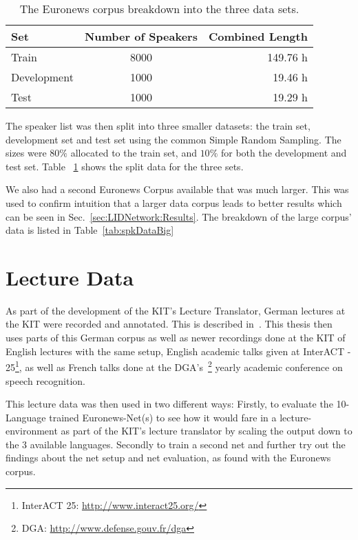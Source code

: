 \begin{table}[h!]
\label{tab:spkSplit}
\centering
\begin{tabular}{| l | c | r | }
	\hline
	\textbf{Set} & \textbf{Number of Speakers} & \textbf{Combined Length} \\
	\hline
	Train &  8000 & 149.76 h \\
	Development & 1000 & 19.46 h \\
	Test & 1000 & 19.29 h \\
	\hline
\end{tabular}
\caption{The Euronews corpus breakdown into the three data sets.}
\end{table}

The speaker list was then split into three smaller datasets: the train set, development set and test set using the common Simple Random Sampling. The sizes were \(80\%\) allocated to the train set, and \(10\%\) for both the development and test set. Table ~\ref{tab:spkSplit} shows the split data for the three sets. 

We also had a second Euronews Corpus available that was much larger. This was used to confirm intuition that a larger data corpus leads to better results which can be seen in Sec.~\ref{sec:LIDNetwork:Results}. The breakdown of the large corpus' data is listed in Table~\ref{tab:spkDataBig}

\newpage
\section{Lecture Data}
\label{sec:LITasks:Lecture}

As part of the development of the KIT's Lecture Translator, German lectures at the KIT were recorded and annotated. This is described in~\cite{stuker2012kit}. This thesis then uses parts of this German corpus as well as newer recordings done at the KIT of English lectures with the same setup, English academic talks given at InterACT - 25\footnote{InterACT 25: \url{http://www.interact25.org/}},  as well as French talks done at the DGA's~\footnote{DGA: \url{http://www.defense.gouv.fr/dga}} yearly academic conference on speech recognition. 

This lecture data was then used in two different ways: Firstly, to evaluate the 10-Language trained Euronews-Net(s) to see how it would fare in a lecture-environment as part of the KIT's lecture translator by scaling the output down to the 3 available languages. Secondly to train a second net and further try out the findings about the net setup and net evaluation, as found with the Euronews corpus.

